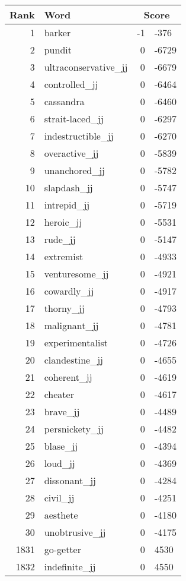 \begin{longtable}[!htbp]{| rlr@{.}l |}
    \hline
    \textbf{Rank} & \textbf{Word} & \multicolumn{2}{c|}{\textbf{Score}} \\
    \hline
    \endhead
    1 & barker & -1 & -376 \\
    2 & pundit & 0 & -6729 \\
    3 & ultraconservative\_jj & 0 & -6679 \\
    4 & controlled\_jj & 0 & -6464 \\
    5 & cassandra & 0 & -6460 \\
    6 & strait-laced\_jj & 0 & -6297 \\
    7 & indestructible\_jj & 0 & -6270 \\
    8 & overactive\_jj & 0 & -5839 \\
    9 & unanchored\_jj & 0 & -5782 \\
    10 & slapdash\_jj & 0 & -5747 \\
    11 & intrepid\_jj & 0 & -5719 \\
    12 & heroic\_jj & 0 & -5531 \\
    13 & rude\_jj & 0 & -5147 \\
    14 & extremist & 0 & -4933 \\
    15 & venturesome\_jj & 0 & -4921 \\
    16 & cowardly\_jj & 0 & -4917 \\
    17 & thorny\_jj & 0 & -4793 \\
    18 & malignant\_jj & 0 & -4781 \\
    19 & experimentalist & 0 & -4726 \\
    20 & clandestine\_jj & 0 & -4655 \\
    21 & coherent\_jj & 0 & -4619 \\
    22 & cheater & 0 & -4617 \\
    23 & brave\_jj & 0 & -4489 \\
    24 & persnickety\_jj & 0 & -4482 \\
    25 & blase\_jj & 0 & -4394 \\
    26 & loud\_jj & 0 & -4369 \\
    27 & dissonant\_jj & 0 & -4284 \\
    28 & civil\_jj & 0 & -4251 \\
    29 & aesthete & 0 & -4180 \\
    30 & unobtrusive\_jj & 0 & -4175 \\
    1831 & go-getter & 0 & 4530 \\
    1832 & indefinite\_jj & 0 & 4550 \\

\end{longtable}
